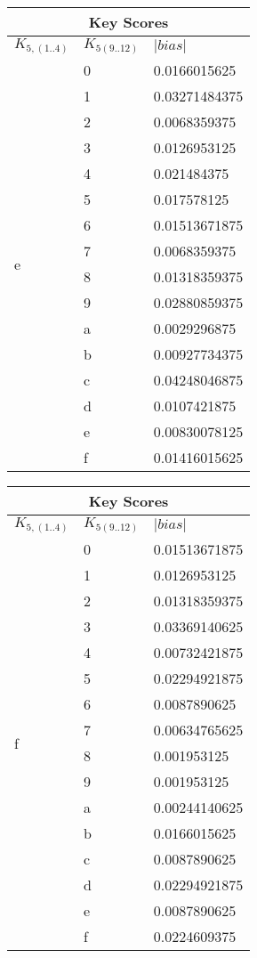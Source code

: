 \documentclass{elsart}
\begin{document}
\begin{tabular}{|l|l|l|}
\hline
\multicolumn{3}{|c|}{Key Scores} \\
\hline
$K_{5,(1..4)}$ & $K_{5(9..12)}$ & $|bias|$  \\ \hline
 \multirow{16}{*}{e} & 0 & 0.0166015625 \\
 & 1 & 0.03271484375 \\
 & 2 & 0.0068359375 \\
 & 3 & 0.0126953125 \\
 & 4 & 0.021484375 \\
 & 5 & 0.017578125 \\
 & 6 & 0.01513671875 \\
 & 7 & 0.0068359375 \\
 & 8 & 0.01318359375 \\
 & 9 & 0.02880859375 \\
 & a & 0.0029296875 \\
 & b & 0.00927734375 \\
 & c & 0.04248046875 \\
 & d & 0.0107421875 \\
 & e & 0.00830078125 \\
 & f & 0.01416015625 \\ \hline
\end{tabular}
\begin{tabular}{|l|l|l|}
\hline
\multicolumn{3}{|c|}{Key Scores} \\
\hline
$K_{5,(1..4)}$ & $K_{5(9..12)}$ & $|bias|$  \\ \hline
 \multirow{16}{*}{f} & 0 & 0.01513671875 \\
 & 1 & 0.0126953125 \\
 & 2 & 0.01318359375 \\
 & 3 & 0.03369140625 \\
 & 4 & 0.00732421875 \\
 & 5 & 0.02294921875 \\
 & 6 & 0.0087890625 \\
 & 7 & 0.00634765625 \\
 & 8 & 0.001953125 \\
 & 9 & 0.001953125 \\
 & a & 0.00244140625 \\
 & b & 0.0166015625 \\
 & c & 0.0087890625 \\
 & d & 0.02294921875 \\
 & e & 0.0087890625 \\
 & f & 0.0224609375 \\
\hline
\end{tabular}
\end{document}
